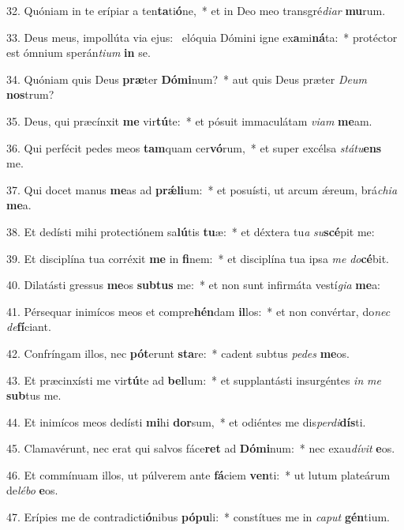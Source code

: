 32. Quóniam in te erípiar a ten\textbf{ta}ti\textbf{ó}ne,~*  et in Deo meo transgré\textit{di}\textit{ar} \textbf{mu}rum.\

33. Deus meus, impollúta via ejus: \dag\  elóquia Dómini igne ex\textbf{a}mi\textbf{ná}ta:~*  protéctor est ómnium sperán\textit{ti}\textit{um} \textbf{in} se.\

34. Quóniam quis Deus \textbf{præ}ter \textbf{Dó}\textbf{mi}num?~*  aut quis Deus præter \textit{De}\textit{um} \textbf{nos}trum?\

35. Deus, qui præcínxit \textbf{me} vir\textbf{tú}te:~*  et pósuit immaculátam \textit{vi}\textit{am} \textbf{me}am.\

36. Qui perfécit pedes meos \textbf{tam}quam cer\textbf{vó}rum,~*  et super excélsa \textit{stá}\textit{tu}\textbf{ens} me.\

37. Qui docet manus \textbf{me}as ad \textbf{prǽ}\textbf{li}um:~*  et posuísti, ut arcum ǽreum, brá\textit{chi}\textit{a} \textbf{me}a.\

38. Et dedísti mihi protectiónem sa\textbf{lú}tis \textbf{tu}æ:~*  et déxtera tu\textit{a} \textit{su}\textbf{scé}pit me:\

39. Et disciplína tua corréxit \textbf{me} in \textbf{fi}nem:~*  et disciplína tua ipsa \textit{me} \textit{do}\textbf{cé}bit.\

40. Dilatásti gressus \textbf{me}os \textbf{sub}\textbf{tus} me:~*  et non sunt infirmáta vestí\textit{gi}\textit{a} \textbf{me}a:\

41. Pérsequar inimícos meos et compre\textbf{hén}dam \textbf{il}los:~*  et non convértar, do\textit{nec} \textit{de}\textbf{fí}ciant.\

42. Confríngam illos, nec \textbf{pót}erunt \textbf{sta}re:~*  cadent subtus \textit{pe}\textit{des} \textbf{me}os.\

43. Et præcinxísti me vir\textbf{tú}te ad \textbf{bel}lum:~*  et supplantásti insurgéntes \textit{in} \textit{me} \textbf{sub}tus me.\

44. Et inimícos meos dedísti \textbf{mi}hi \textbf{dor}sum,~*  et odiéntes me dis\textit{per}\textit{di}\textbf{dís}ti.\

45. Clamavérunt, nec erat qui salvos fáce\textbf{ret} ad \textbf{Dó}\textbf{mi}num:~*  nec exau\textit{dí}\textit{vit} \textbf{e}os.\

46. Et commínuam illos, ut púlverem ante \textbf{fá}ciem \textbf{ven}ti:~*  ut lutum plateárum de\textit{lé}\textit{bo} \textbf{e}os.\

47. Erípies me de contradicti\textbf{ó}nibus \textbf{pó}\textbf{pu}li:~*  constítues me in \textit{ca}\textit{put} \textbf{gén}tium.\

